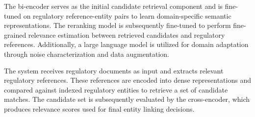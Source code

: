 The bi-encoder serves as the initial candidate retrieval component and is fine-tuned on regulatory reference-entity pairs to learn domain-specific semantic representations. The reranking model is subsequently fine-tuned to perform fine-grained relevance estimation between retrieved candidates and regulatory references. Additionally, a large language model is utilized for domain adaptation through noise characterization and data augmentation.

The system receives regulatory documents as input and extracts relevant regulatory references. These references are encoded into dense representations and compared against indexed regulatory entities to retrieve a set of candidate matches. The candidate set is subsequently evaluated by the cross-encoder, which produces relevance scores used for final entity linking decisions.